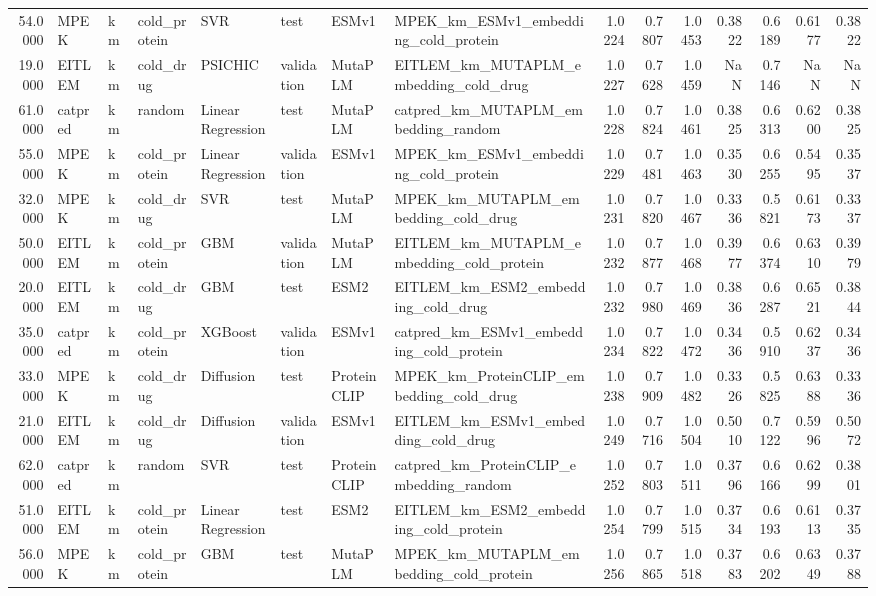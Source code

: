 \begin{tabular}{rlllllllrrrrrrr}
54.0000 & MPEK & km & cold_protein & SVR & test & ESMv1 & MPEK_km_ESMv1_embedding_cold_protein & 1.0224 & 0.7807 & 1.0453 & 0.3822 & 0.6189 & 0.6177 & 0.3822 \\
19.0000 & EITLEM & km & cold_drug & PSICHIC & validation & MutaPLM & EITLEM_km_MUTAPLM_embedding_cold_drug & 1.0227 & 0.7628 & 1.0459 & NaN & 0.7146 & NaN & NaN \\
61.0000 & catpred & km & random & Linear Regression & test & MutaPLM & catpred_km_MUTAPLM_embedding_random & 1.0228 & 0.7824 & 1.0461 & 0.3825 & 0.6313 & 0.6200 & 0.3825 \\
55.0000 & MPEK & km & cold_protein & Linear Regression & validation & ESMv1 & MPEK_km_ESMv1_embedding_cold_protein & 1.0229 & 0.7481 & 1.0463 & 0.3530 & 0.6255 & 0.5495 & 0.3537 \\
32.0000 & MPEK & km & cold_drug & SVR & test & MutaPLM & MPEK_km_MUTAPLM_embedding_cold_drug & 1.0231 & 0.7820 & 1.0467 & 0.3336 & 0.5821 & 0.6173 & 0.3337 \\
50.0000 & EITLEM & km & cold_protein & GBM & validation & MutaPLM & EITLEM_km_MUTAPLM_embedding_cold_protein & 1.0232 & 0.7877 & 1.0468 & 0.3977 & 0.6374 & 0.6310 & 0.3979 \\
20.0000 & EITLEM & km & cold_drug & GBM & test & ESM2 & EITLEM_km_ESM2_embedding_cold_drug & 1.0232 & 0.7980 & 1.0469 & 0.3836 & 0.6287 & 0.6521 & 0.3844 \\
35.0000 & catpred & km & cold_protein & XGBoost & validation & ESMv1 & catpred_km_ESMv1_embedding_cold_protein & 1.0234 & 0.7822 & 1.0472 & 0.3436 & 0.5910 & 0.6237 & 0.3436 \\
33.0000 & MPEK & km & cold_drug & Diffusion & test & ProteinCLIP & MPEK_km_ProteinCLIP_embedding_cold_drug & 1.0238 & 0.7909 & 1.0482 & 0.3326 & 0.5825 & 0.6388 & 0.3336 \\
21.0000 & EITLEM & km & cold_drug & Diffusion & validation & ESMv1 & EITLEM_km_ESMv1_embedding_cold_drug & 1.0249 & 0.7716 & 1.0504 & 0.5010 & 0.7122 & 0.5996 & 0.5072 \\
62.0000 & catpred & km & random & SVR & test & ProteinCLIP & catpred_km_ProteinCLIP_embedding_random & 1.0252 & 0.7803 & 1.0511 & 0.3796 & 0.6166 & 0.6299 & 0.3801 \\
51.0000 & EITLEM & km & cold_protein & Linear Regression & test & ESM2 & EITLEM_km_ESM2_embedding_cold_protein & 1.0254 & 0.7799 & 1.0515 & 0.3734 & 0.6193 & 0.6113 & 0.3735 \\
56.0000 & MPEK & km & cold_protein & GBM & test & MutaPLM & MPEK_km_MUTAPLM_embedding_cold_protein & 1.0256 & 0.7865 & 1.0518 & 0.3783 & 0.6202 & 0.6349 & 0.3788 \\

\end{tabular}
